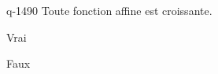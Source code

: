 \begin{truefalse}{q-1490}
Toute fonction affine est croissante.
\item Vrai
\item* Faux
\end{truefalse}

